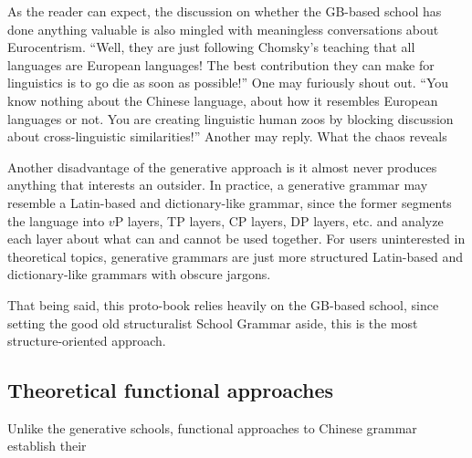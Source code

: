 As the reader can expect, the discussion on whether the GB-based school has done anything valuable 
is also mingled with meaningless conversations about Eurocentrism. ``Well, they are just following 
Chomsky's teaching that all languages are European languages! The best contribution they can make for 
linguistics is to go die as soon as possible!'' One may furiously shout out. ``You know nothing about 
the Chinese language, about how it resembles European languages or not. You are creating linguistic 
human zoos by blocking discussion about cross-linguistic similarities!'' Another may reply.
What the chaos reveals %

Another disadvantage of the generative approach is it almost never produces anything that interests an outsider.
In practice, a generative grammar may resemble a Latin-based and dictionary-like grammar, since the former 
segments the language into $v$P layers, TP layers, CP layers, DP layers, etc. and analyze each layer 
about what can and cannot be used together. For users uninterested in theoretical topics,
generative grammars are just more structured Latin-based and dictionary-like grammars with obscure jargons.

That being said, this proto-book relies heavily on the GB-based school, since setting the good old structuralist
School Grammar aside, this is the most structure-oriented approach.

\subsection{Theoretical functional approaches}

Unlike the generative schools, functional approaches to Chinese grammar establish their 
